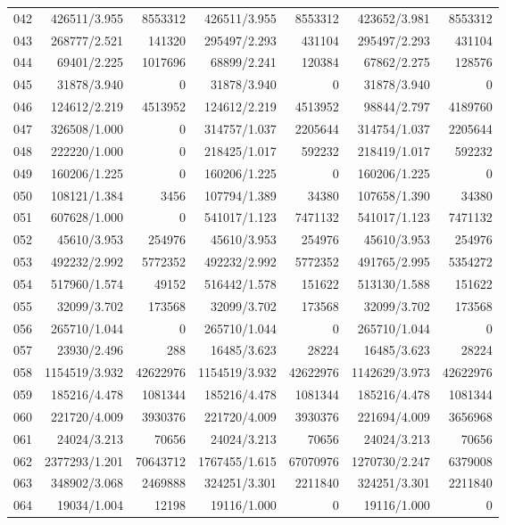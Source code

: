 \begin{longtable}{crrrrrr}
042 & 426511/3.955 & 8553312 & 426511/3.955 & 8553312 & 423652/3.981 & 8553312 \\
043 & 268777/2.521 & 141320 & 295497/2.293 & 431104 & 295497/2.293 & 431104 \\
044 & 69401/2.225 & 1017696 & 68899/2.241 & 120384 & 67862/2.275 & 128576 \\
045 & 31878/3.940 & 0 & 31878/3.940 & 0 & 31878/3.940 & 0 \\
046 & 124612/2.219 & 4513952 & 124612/2.219 & 4513952 & 98844/2.797 & 4189760 \\
047 & 326508/1.000 & 0 & 314757/1.037 & 2205644 & 314754/1.037 & 2205644 \\
048 & 222220/1.000 & 0 & 218425/1.017 & 592232 & 218419/1.017 & 592232 \\
049 & 160206/1.225 & 0 & 160206/1.225 & 0 & 160206/1.225 & 0 \\
050 & 108121/1.384 & 3456 & 107794/1.389 & 34380 & 107658/1.390 & 34380 \\
051 & 607628/1.000 & 0 & 541017/1.123 & 7471132 & 541017/1.123 & 7471132 \\
052 & 45610/3.953 & 254976 & 45610/3.953 & 254976 & 45610/3.953 & 254976 \\
053 & 492232/2.992 & 5772352 & 492232/2.992 & 5772352 & 491765/2.995 & 5354272 \\
054 & 517960/1.574 & 49152 & 516442/1.578 & 151622 & 513130/1.588 & 151622 \\
055 & 32099/3.702 & 173568 & 32099/3.702 & 173568 & 32099/3.702 & 173568 \\
056 & 265710/1.044 & 0 & 265710/1.044 & 0 & 265710/1.044 & 0 \\
057 & 23930/2.496 & 288 & 16485/3.623 & 28224 & 16485/3.623 & 28224 \\
058 & 1154519/3.932 & 42622976 & 1154519/3.932 & 42622976 & 1142629/3.973 & 42622976 \\
059 & 185216/4.478 & 1081344 & 185216/4.478 & 1081344 & 185216/4.478 & 1081344 \\
060 & 221720/4.009 & 3930376 & 221720/4.009 & 3930376 & 221694/4.009 & 3656968 \\
061 & 24024/3.213 & 70656 & 24024/3.213 & 70656 & 24024/3.213 & 70656 \\
062 & 2377293/1.201 & 70643712 & 1767455/1.615 & 67070976 & 1270730/2.247 & 6379008 \\
063 & 348902/3.068 & 2469888 & 324251/3.301 & 2211840 & 324251/3.301 & 2211840 \\
064 & 19034/1.004 & 12198 & 19116/1.000 & 0 & 19116/1.000 & 0 \\

\end{longtable}
